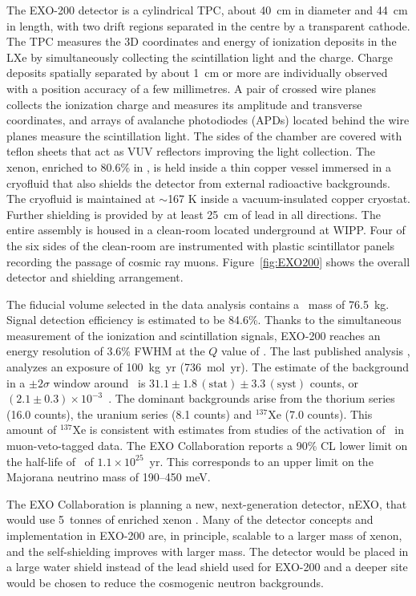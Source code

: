 \documentclass{PoS}
\begin{document}
The EXO-200 detector is a cylindrical TPC, about 40~cm in diameter and 44~cm in length, with two drift regions separated in the centre by a transparent cathode. The TPC measures the 3D coordinates and energy of ionization deposits in the LXe by simultaneously collecting the scintillation light and the charge. Charge deposits spatially separated by about 1~cm or more are individually observed with a position accuracy of a few millimetres. A pair of crossed wire planes collects the ionization charge and measures its amplitude and transverse coordinates, and arrays of avalanche photodiodes (APDs) located behind the wire planes measure the scintillation light. The sides of the chamber are covered with teflon sheets that act as VUV reflectors improving the light collection. The xenon, enriched to 80.6\% in \XE, is held inside a thin copper vessel immersed in a cryofluid that also shields the detector from external radioactive backgrounds. The cryofluid is maintained at $\sim$167 K inside a vacuum-insulated copper cryostat. Further shielding is provided by at least 25~cm of lead in all directions. The entire assembly is housed in a clean-room located underground at WIPP. Four of the six sides of the clean-room are instrumented with plastic scintillator panels recording the passage of cosmic ray muons. Figure~\ref{fig:EXO200} shows the overall detector and shielding arrangement.


The fiducial volume selected in the data analysis contains a \XE\ mass of 76.5~kg. Signal detection efficiency is estimated to be 84.6\%. Thanks to the simultaneous measurement of the ionization and scintillation signals, EXO-200 reaches an energy resolution of 3.6\% FWHM at the $Q$ value of \XE. The last published analysis \cite{Albert:2014awa}, analyzes an exposure of 100~kg~yr (736~mol~yr). The estimate of the background in a $\pm2\sigma$ window around \Qbb\ is $31.1\pm1.8\,(\mathrm{stat})\pm3.3\,(\mathrm{syst})$ counts, or $(2.1\pm0.3)\times10^{-3}$~\ckky. The dominant backgrounds arise from the thorium series (16.0 counts), the uranium series (8.1 counts) and $^{137}$Xe (7.0 counts). This amount of $^{137}$Xe is consistent with estimates from studies of the activation of \XE\ in muon-veto-tagged data. The EXO Collaboration reports a 90\% CL lower limit on the half-life of \XE\ of $1.1\times10^{25}$~yr. This corresponds to an upper limit on the Majorana neutrino mass of 190--450 meV.

The EXO Collaboration is planning a new, next-generation detector, nEXO, that would use 5~tonnes of enriched xenon \cite{Albert:2014afa}. Many of the detector concepts and implementation in EXO-200 are, in principle, scalable to a larger mass of xenon, and the self-shielding improves with larger mass. The detector would be placed in a large water shield instead of the lead shield used for EXO-200 and a deeper site would be chosen to reduce the cosmogenic neutron backgrounds.
\end{document}
